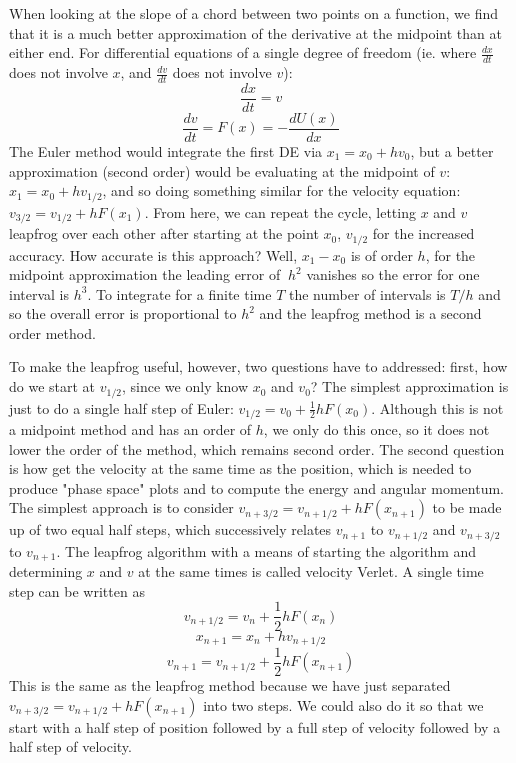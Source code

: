 \documentclass[12pt]{article}
\begin{document}
When looking at the slope of a chord between two points on a function, we find that it is a much better approximation of the derivative at the midpoint than at either end. For differential equations of a single degree of freedom (ie. where $\frac{dx}{dt}$ does not involve $x$, and $\frac{dv}{dt}$ does not involve $v$):
$$\frac{dx}{dt}=v$$
$$\frac{dv}{dt}=F(x)=-\frac{dU(x)}{dx}$$
The Euler method would integrate the first DE via $x_1=x_0+hv_0$, but a better approximation (second order) would be evaluating at the midpoint of $v$: $x_1=x_0+hv_{1/2}$, and so doing something similar for the velocity equation: $v_{3/2}=v_{1/2}+hF(x_1)$. From here, we can repeat the cycle, letting $x$ and $v$ leapfrog over each other after starting at the point $x_0$, $v_{1/2}$ for the increased accuracy. How accurate is this approach? Well, $x_1-x_0$ is of order $h$, for the midpoint approximation the leading error of $~h^2$ vanishes so the error for one interval is $h^3$. To integrate for a finite time $T$ the number of intervals is $T/h$ and so the overall error is proportional to $h^2$ and the leapfrog method is a second order method.

To make the leapfrog useful, however, two questions have to addressed: first, how do we start at $v_{1/2}$, since we only know $x_0$ and $v_0$? The simplest approximation is just to do a single half step of Euler: $v_{1/2}=v_0+\frac{1}{2}hF(x_0)$. Although this is not a midpoint method and has an order of $h$, we only do this once, so it does not lower the order of the method, which remains second order. The second question is how get the velocity at the same time as the position, which is needed to produce "phase space" plots and to compute the energy and angular momentum. The simplest approach is to consider $v_{n+3/2}=v_{n+1/2}+hF(x_{n+1})$ to be made up of two equal half steps, which successively relates $v_{n+1}$ to $v_{n+1/2}$ and $v_{n+3/2}$ to $v_{n+1}$. The leapfrog algorithm with a means of starting the algorithm and determining $x$ and $v$ at the same times is called velocity Verlet. A single time step can be written as
$$v_{n+1/2}=v_n+\frac{1}{2}hF(x_n)$$
$$x_{n+1}=x_n+hv_{n+1/2}$$
$$v_{n+1}=v_{n+1/2}+\frac{1}{2}hF(x_{n+1})$$
This is the same as the leapfrog method because we have just separated $v_{n+3/2}=v_{n+1/2}+hF(x_{n+1})$ into two steps. We could also do it so that we start with a half step of position followed by a full step of velocity followed by a half step of velocity.
\end{document}
